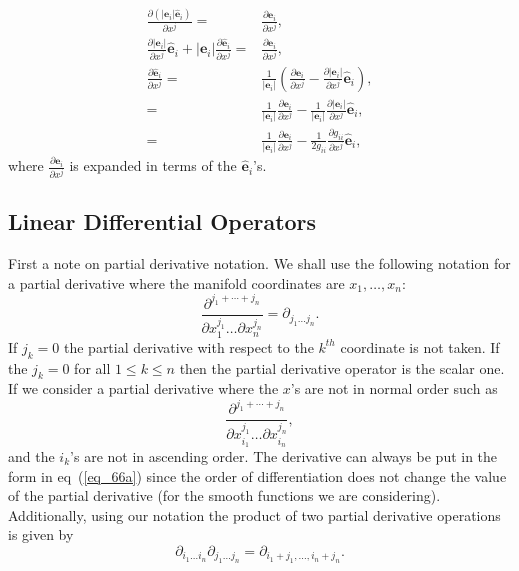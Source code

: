 \documentclass[12pt]{report}
\newcommand{\bm}[1]{\boldsymbol{#1}}
\newcommand{\bfrac}[2]{\displaystyle\frac{#1}{#2}}
\newcommand{\lp}{\left (}
\newcommand{\rp}{\right )}
\newcommand{\abs}[1]{\left |{#1}\right |}
\newcommand{\pdiff}[2]{\bfrac{\partial {#1}}{\partial {#2}}}
\newcommand{\paren}[1]{\lp {#1} \rp}
\newcommand{\be}{\begin{equation}}
\newcommand{\ee}{\end{equation}}
\begin{document}
\begin{align}
    \pdiff{\paren{\abs{\bm{e}_{i}}\bm{\hat{e}}_{i}}}{x^{j}} =& \pdiff{\bm{e}_{i}}{x^{j}}, \nonumber \\
    \pdiff{\abs{\bm{e}_{i}}}{x^{j}}\bm{\hat{e}}_{i}
                                      +\abs{\bm{e}_{i}}\pdiff{\bm{\hat{e}}_{i}}{x^{j}} =& \pdiff{\bm{e}_{i}}{x^{j}}, \nonumber \\
    \pdiff{\bm{\hat{e}}_{i}}{x^{j}} =& \bfrac{1}{\abs{\bm{e}_{i}}}\paren{\pdiff{\bm{e}_{i}}{x^{j}}
                                       -\pdiff{\abs{\bm{e}_{i}}}{x^{j}}\bm{\hat{e}}_{i}},\nonumber \\
                                    =& \bfrac{1}{\abs{\bm{e}_{i}}}\pdiff{\bm{e}_{i}}{x^{j}}
                                       -\bfrac{1}{\abs{\bm{e}_{i}}}\pdiff{\abs{\bm{e}_{i}}}{x^{j}}\bm{\hat{e}}_{i},\nonumber \\
                                    =& \bfrac{1}{\abs{\bm{e}_{i}}}\pdiff{\bm{e}_{i}}{x^{j}}
                                       -\bfrac{1}{2g_{ii}}\pdiff{g_{ii}}{x^{j}}\bm{\hat{e}}_{i},
\end{align}
where $\pdiff{\bm{e}_{i}}{x^{j}}$ is expanded in terms of the $\bm{\hat{e}}_{i}$'s.

\subsection{Linear Differential Operators}\label{ldops}

First a note on partial derivative notation.  We shall use the following notation for a partial derivative where
the manifold coordinates are $x_{1},\dots,x_{n}$:
\be\label{eq_66a}
    \bfrac{\partial^{j_{1}+\cdots+j_{n}}}{\partial x_{1}^{j_{1}}\dots\partial x_{n}^{j_{n}}} = \partial_{j_{1}\dots j_{n}}.
\ee
If $j_{k}=0$ the partial derivative with respect to the $k^{th}$ coordinate is not taken.  If the $j_{k} = 0$ for all
$1 \le k \le n$ then the partial derivative operator is the scalar one.  If we consider a partial derivative where the $x$'s are
not in normal order such as
\begin{equation*}
    \bfrac{\partial^{j_{1}+\cdots+j_{n}}}{\partial x_{i_{1}}^{j_{1}}\dots\partial x_{i_{n}}^{j_{n}}},
\end{equation*}
and the $i_{k}$'s are not in ascending order.  The derivative can always be  put in the form in eq~(\ref{eq_66a}) since the order
of differentiation does not change the value of the partial derivative (for the smooth functions we are considering).
Additionally, using our notation the product of two partial derivative operations is given by
\be
    \partial_{i_{1}\dots i_{n}}\partial_{j_{1}\dots j_{n}} = \partial_{i_{1}+j_{1},\dots, i_{n}+j_{n}}.
\ee
\end{document}
